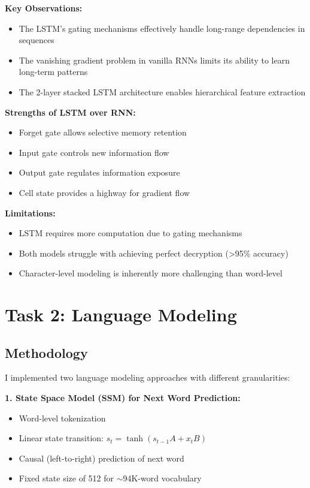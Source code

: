 \documentclass[12pt]{article}
\begin{document}
\textbf{Key Observations:}
\begin{itemize}
    \item The LSTM's gating mechanisms effectively handle long-range dependencies in sequences
    \item The vanishing gradient problem in vanilla RNNs limits its ability to learn long-term patterns
    \item The 2-layer stacked LSTM architecture enables hierarchical feature extraction
\end{itemize}

\textbf{Strengths of LSTM over RNN:}
\begin{itemize}
    \item Forget gate allows selective memory retention
    \item Input gate controls new information flow
    \item Output gate regulates information exposure
    \item Cell state provides a highway for gradient flow
\end{itemize}

\textbf{Limitations:}
\begin{itemize}
    \item LSTM requires more computation due to gating mechanisms
    \item Both models struggle with achieving perfect decryption (>95\% accuracy)
    \item Character-level modeling is inherently more challenging than word-level
\end{itemize}

\section{Task 2: Language Modeling}

\subsection{Methodology}

I implemented two language modeling approaches with different granularities:

\textbf{1. State Space Model (SSM) for Next Word Prediction:}
\begin{itemize}
    \item Word-level tokenization
    \item Linear state transition: $s_t = \tanh(s_{t-1}A + x_t B)$
    \item Causal (left-to-right) prediction of next word
    \item Fixed state size of 512 for $\sim$94K-word vocabulary
\end{itemize}
\end{document}
